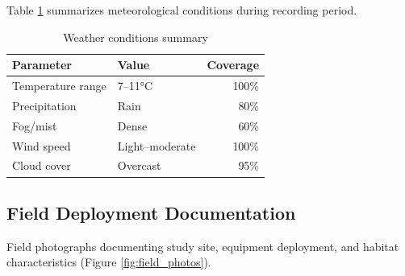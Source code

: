 \documentclass[twocolumn]{article}
\begin{document}
Table \ref{tab:weather} summarizes meteorological conditions during recording period.

\begin{table}[H]
\centering
\caption{Weather conditions summary}
\label{tab:weather}
\begin{tabular}{llr}
\toprule
\textbf{Parameter} & \textbf{Value} & \textbf{Coverage} \\
\midrule
Temperature range & 7--11°C & 100\% \\
Precipitation & Rain & 80\% \\
Fog/mist & Dense & 60\% \\
Wind speed & Light--moderate & 100\% \\
Cloud cover & Overcast & 95\% \\
\bottomrule
\end{tabular}
\end{table}

\subsection{Field Deployment Documentation}

Field photographs documenting study site, equipment deployment, and habitat characteristics (Figure \ref{fig:field_photos}).
\end{document}
